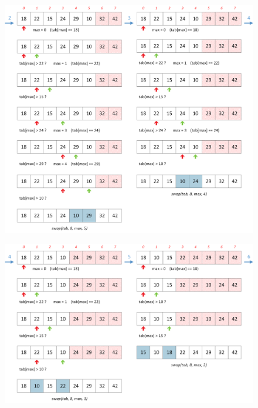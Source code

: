 \documentclass[11pt,a4paper]{article}
\begin{document}
\vfill


\clearpage

\vfillFirst

\begin{figure}[ht!]
\centering
\centerline{
\includegraphics[width=1.2\textwidth]{img/tris/2_per_pages/SelectionSort_part2.png}
}
\end{figure}

\vfillLast

\clearpage

\begin{figure}[ht!]
\centering
\centerline{
\includegraphics[width=1.2\textwidth]{img/tris/2_per_pages/SelectionSort_part3.png}
}
\end{figure}
\end{document}
